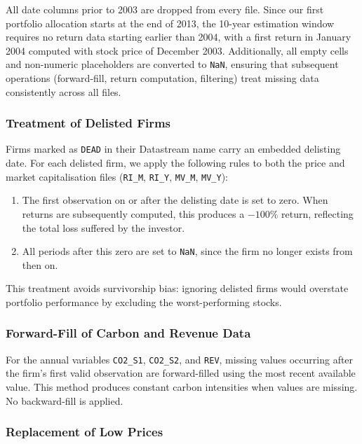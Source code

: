 \documentclass[11pt,a4paper]{article}
\begin{document}
All date columns prior to 2003 are dropped from every file. Since our first portfolio allocation starts at the end of 2013, the 10-year estimation window requires no return data starting earlier than 2004, with a first return in January 2004 computed with stock price of December 2003. Additionally, all empty cells and non-numeric placeholders are converted to \texttt{NaN}, ensuring that subsequent operations (forward-fill, return computation, filtering) treat missing data consistently across all files.

\subsubsection{Treatment of Delisted Firms}

Firms marked as \texttt{DEAD} in their Datastream name carry an embedded delisting date. For each delisted firm, we apply the following rules to both the price and market capitalisation files (\texttt{RI\_M}, \texttt{RI\_Y}, \texttt{MV\_M}, \texttt{MV\_Y}):

\begin{enumerate}[leftmargin=*]
    \item The first observation on or after the delisting date is set to zero. When returns are subsequently computed, this produces a $-100\%$ return, reflecting the total loss suffered by the investor.
    \item All periods after this zero are set to \texttt{NaN}, since the firm no longer exists from then on.
\end{enumerate}

This treatment avoids survivorship bias: ignoring delisted firms would overstate portfolio performance by excluding the worst-performing stocks.

\subsubsection{Forward-Fill of Carbon and Revenue Data}

For the annual variables \texttt{CO2\_S1}, \texttt{CO2\_S2}, and \texttt{REV}, missing values occurring after the firm's first valid observation are forward-filled using the most recent available value. This method produces constant carbon intensities when values are missing. No backward-fill is applied.

\subsubsection{Replacement of Low Prices}
\end{document}
